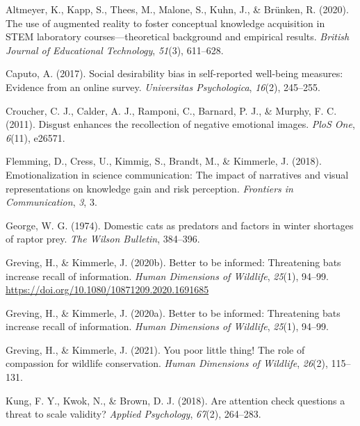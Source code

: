 \documentclass[
  man,
  longtable,
  nolmodern,
  notxfonts,
  notimes,
  colorlinks=true,linkcolor=blue,citecolor=blue,urlcolor=blue]{apa7}
\newlength{\cslhangindent}
\newenvironment{CSLReferences}[2] %
 {\begin{list}{}{%
  \setlength{\itemindent}{0pt}
  \setlength{\leftmargin}{0pt}
  \setlength{\parsep}{0pt}
  \ifodd #1
   \setlength{\leftmargin}{\cslhangindent}
   \setlength{\itemindent}{-1\cslhangindent}
  \fi
  \setlength{\itemsep}{#2\baselineskip}}}
 {\end{list}}
\begin{document}
\label{refs}
\begin{CSLReferences}{1}{0}
Altmeyer, K., Kapp, S., Thees, M., Malone, S., Kuhn, J., \& Brünken, R.
(2020). The use of augmented reality to foster conceptual knowledge
acquisition in STEM laboratory courses---theoretical background and
empirical results. \emph{British Journal of Educational Technology},
\emph{51}(3), 611--628.

Caputo, A. (2017). Social desirability bias in self-reported well-being
measures: Evidence from an online survey. \emph{Universitas
Psychologica}, \emph{16}(2), 245--255.

Croucher, C. J., Calder, A. J., Ramponi, C., Barnard, P. J., \& Murphy,
F. C. (2011). Disgust enhances the recollection of negative emotional
images. \emph{PloS One}, \emph{6}(11), e26571.

Flemming, D., Cress, U., Kimmig, S., Brandt, M., \& Kimmerle, J. (2018).
Emotionalization in science communication: The impact of narratives and
visual representations on knowledge gain and risk perception.
\emph{Frontiers in Communication}, \emph{3}, 3.

George, W. G. (1974). Domestic cats as predators and factors in winter
shortages of raptor prey. \emph{The Wilson Bulletin}, 384--396.

Greving, H., \& Kimmerle, J. (2020b). Better to be informed: Threatening
bats increase recall of information. \emph{Human Dimensions of
Wildlife}, \emph{25}(1), 94--99.
\url{https://doi.org/10.1080/10871209.2020.1691685}

Greving, H., \& Kimmerle, J. (2020a). Better to be informed: Threatening
bats increase recall of information. \emph{Human Dimensions of
Wildlife}, \emph{25}(1), 94--99.

Greving, H., \& Kimmerle, J. (2021). You poor little thing! The role of
compassion for wildlife conservation. \emph{Human Dimensions of
Wildlife}, \emph{26}(2), 115--131.

Kung, F. Y., Kwok, N., \& Brown, D. J. (2018). Are attention check
questions a threat to scale validity? \emph{Applied Psychology},
\emph{67}(2), 264--283.


\end{CSLReferences}
\end{document}
